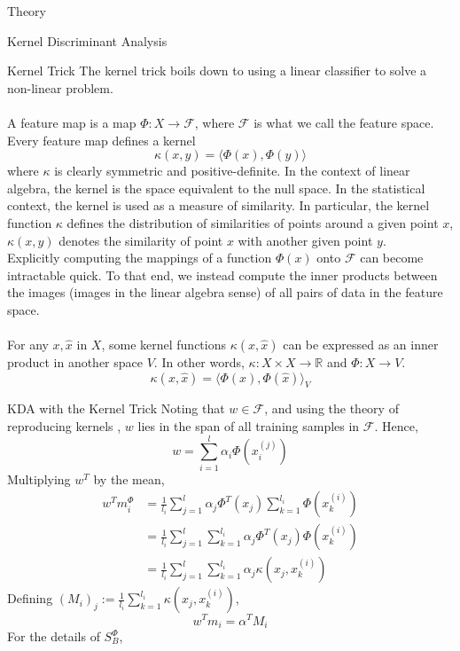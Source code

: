 \begin{section}{Theory}
\begin{subsection}{Kernel Discriminant Analysis}
\begin{subsubsection}{Kernel Trick}
The kernel trick boils down to using a linear classifier to solve a non-linear problem.
\\
\\
A feature map is a map $\Phi:X \to \mathcal{F}$, where $\mathcal{F}$ is what we call the feature space. Every feature map defines a kernel
$$
	\kappa(x,y) = \langle \Phi(x), \Phi(y) \rangle
$$
where $\kappa$ is clearly symmetric and positive-definite. In the context of linear algebra, the kernel is the space equivalent to the null space. In the statistical context, the kernel is used as a measure of similarity. In particular, the kernel function $\kappa$ defines the distribution of similarities of points around a given point $x$, $\kappa(x,y)$ denotes the similarity of point $x$ with another given point $y$. 
\\

Explicitly computing the mappings of a function $\Phi(x)$ onto $\mathcal{F}$ can become intractable quick. To that end, we instead compute the inner products between the images (images in the linear algebra sense) of all pairs of data in the feature space.
\\
\\
For any $x, \hat{x}$ in $X$, some kernel functions $\kappa(x,\hat{x})$ can be expressed as an inner product in another space $V$. In other words, $\kappa : X \times X \to \mathbb{R}$ and $\Phi : X \to V$.
$$
	\kappa(x, \hat{x}) = \langle \Phi(x), \Phi( \hat{x} ) \rangle_V
$$
\end{subsubsection}

\begin{subsubsection}{KDA with the Kernel Trick}
Noting that $w \in \mathcal{F}$, and using the theory of reproducing kernels \cite{kernTheory}, $w$ lies in the span of all training samples in $\mathcal{F}$. Hence, 
$$
	w = \sum_{i=1}^l \alpha_i \Phi \left( x_i^{(j)} \right)
$$
Multiplying $w^T$ by the mean,
\begin{align*}
	w^T m_i^{\Phi} &= \frac{1}{l_i} \sum_{j=1}^l \alpha_j \Phi^T \left( x_j \right)
		\sum_{k=1}^{l_i} \Phi \left( x_k^{(i)} \right ) \\
	&= \frac{1}{l_i} \sum_{j=1}^l \sum_{k=1}^{l_i} 
		\alpha_j \Phi^T \left( x_j \right) \Phi \left( x_k^{(i)} \right ) \\
	&= \frac{1}{l_i} \sum_{j=1}^l \sum_{k=1}^{l_i} \alpha_j \kappa \left( x_j, x_k^{(i)} \right)
\end{align*}
Defining $\left( M_i \right)_j := \frac{1}{l_i} \sum_{k=1}^{l_i} \kappa \left( x_j, x_k^{(i)} \right)$, 
$$
	w^T m_i = \alpha^T M_i
$$
For the details of $S_B^{\Phi}$,


\end{subsubsection}
\end{subsection}
\end{section}
